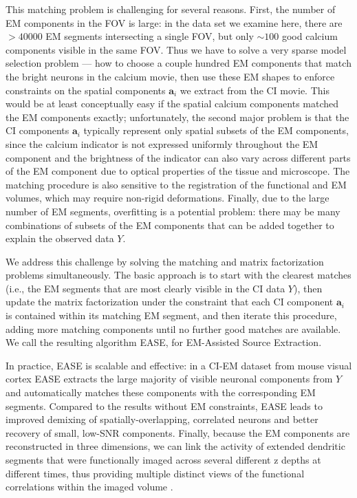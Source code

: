 \documentclass[10pt,letterpaper]{article}
\begin{document}
This matching problem is challenging for several reasons.  First, the number of EM components in the FOV is large: in the data set we examine here, there are $>40000$ EM segments intersecting a single FOV, but only $\sim 100$ good calcium components visible in the same FOV.  Thus we have to solve a very sparse model selection problem --- how to choose a couple hundred EM components that match the bright neurons in the calcium movie, then use these EM shapes to enforce constraints on the spatial components $\bm{a}_i$ we extract from the CI movie.  This would be at least conceptually easy if the spatial calcium components matched the EM components exactly; unfortunately, the second major problem is that the CI components $\bm{a}_i$ typically represent only spatial subsets of the EM components, since the calcium indicator is not expressed uniformly throughout the EM component and the brightness of the indicator can also vary across different parts of the EM component due to optical properties of the tissue and microscope. The matching procedure is also sensitive to the registration of the functional and EM volumes, which may require non-rigid deformations. Finally, due to the large number of EM segments, overfitting is a potential problem: there may be many combinations of subsets of the EM components that can be added together to explain the observed data $Y$.

We address this challenge by solving the matching and matrix factorization problems simultaneously.  The basic approach is to start with the clearest matches (i.e., the EM segments that are most clearly visible in the CI data $Y$), then update the matrix factorization under the constraint that each CI component $\bm{a}_i$ is contained within its matching EM segment, and then iterate this procedure, adding more matching components until no further good matches are available.  We call the resulting algorithm EASE, for EM-Assisted Source Extraction.

In practice, EASE is scalable and effective: in a CI-EM dataset from mouse visual cortex EASE extracts the large majority of visible neuronal components from $Y$ and automatically matches these components with the corresponding EM segments. Compared to the results without EM constraints, EASE leads to improved demixing of spatially-overlapping, correlated neurons and better recovery of small, low-SNR components. 
Finally, because the EM components are reconstructed in three dimensions, we can link the activity of extended dendritic segments that were functionally imaged across several different z depths at different times, thus providing multiple distinct views of the functional correlations within the imaged volume \citep{Soudry2015}.
\end{document}
